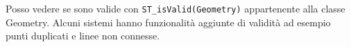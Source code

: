 \documentclass[a4paper,12pt]{article}
\begin{document}
Posso vedere se sono valide con \texttt{ST\_isValid(Geometry)} appartenente alla classe Geometry. Alcuni sistemi hanno funzionalità aggiunte di validità ad esempio punti duplicati e linee non connesse.



\end{document}
